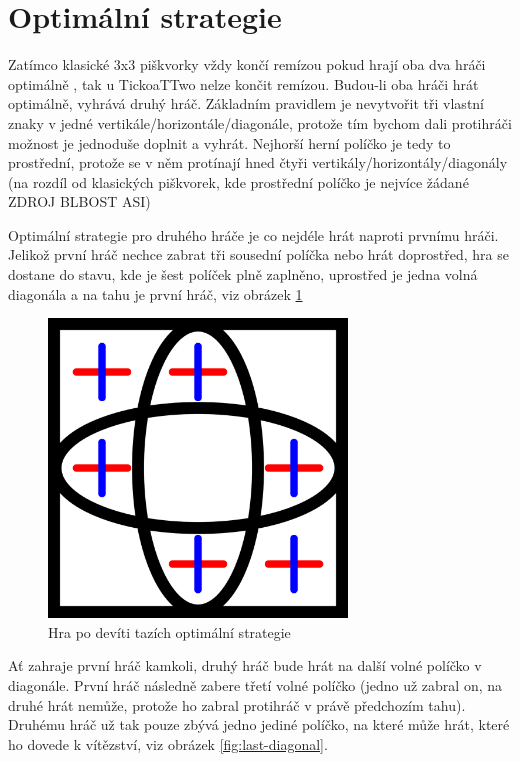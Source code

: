 
\section{Optimální strategie}
Zatímco klasické 3x3 piškvorky vždy končí remízou pokud hrají oba dva hráči optimálně
\cite{crowley1993}, tak u TickoaTTwo nelze končit remízou. Budou-li oba hráči hrát
optimálně, vyhrává druhý hráč. Základním pravidlem je nevytvořit tři vlastní
znaky v jedné vertikále/horizontále/diagonále, protože tím bychom dali
protihráči možnost je jednoduše doplnit a vyhrát. Nejhorší herní políčko je
tedy to prostřední, protože se v něm protínají hned čtyři
vertikály/horizontály/diagonály (na rozdíl od klasických piškvorek, kde
prostřední políčko je nejvíce žádané ZDROJ BLBOST ASI)

Optimální strategie pro druhého hráče je co nejdéle hrát naproti prvnímu hráči.
Jelikož první hráč nechce zabrat tři sousední políčka nebo hrát doprostřed, hra
se dostane do stavu, kde je šest políček plně zaplněno, uprostřed je jedna
volná diagonála a na tahu je první hráč, viz obrázek \ref{fig:empty-diagonal}


\begin{figure}[h]
    \centering
    \includegraphics[width=300px]{img/empty-diagonal.png}
    \caption{Hra po devíti tazích optimální strategie}
    \label{fig:empty-diagonal}
\end{figure}

Ať zahraje první hráč kamkoli, druhý hráč bude hrát na další volné políčko v
diagonále. První hráč následně zabere třetí volné políčko (jedno už zabral on,
na druhé hrát nemůže, protože ho zabral protihráč v právě předchozím tahu).
Druhému hráč už tak pouze zbývá jedno jediné políčko, na které může hrát, které
ho dovede k vítězství, viz obrázek \ref{fig:last-diagonal}.

